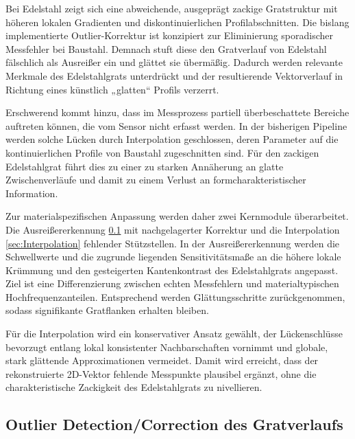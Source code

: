 Bei Edelstahl zeigt sich eine abweichende, ausgeprägt zackige Gratstruktur mit höheren lokalen Gradienten und diskontinuierlichen Profilabschnitten. Die bislang implementierte Outlier-Korrektur ist konzipiert zur Eliminierung sporadischer Messfehler bei Baustahl. Demnach stuft diese den Gratverlauf von Edelstahl fälschlich als Ausreißer ein und glättet sie übermäßig. Dadurch werden relevante Merkmale des Edelstahlgrats unterdrückt und der resultierende Vektorverlauf in Richtung eines künstlich „glatten“ Profils verzerrt.

Erschwerend kommt hinzu, dass im Messprozess partiell überbeschattete Bereiche auftreten können, die vom Sensor nicht erfasst werden. In der bisherigen Pipeline werden solche Lücken durch Interpolation geschlossen, deren Parameter auf die kontinuierlichen Profile von Baustahl zugeschnitten sind. Für den zackigen Edelstahlgrat führt dies zu einer zu starken Annäherung an glatte Zwischenverläufe und damit zu einem Verlust an formcharakteristischer Information.

Zur materialspezifischen Anpassung werden daher zwei Kernmodule überarbeitet. Die Ausreißererkennung \cref{sec:Outlier Detection/Correction} mit nachgelagerter Korrektur und die Interpolation \cref{sec:Interpolation} fehlender Stützstellen. In der Ausreißererkennung werden die Schwellwerte und die zugrunde liegenden Sensitivitätsmaße an die höhere lokale Krümmung und den gesteigerten Kantenkontrast des Edelstahlgrats angepasst. Ziel ist eine Differenzierung zwischen echten Messfehlern und materialtypischen Hochfrequenzanteilen. Entsprechend werden Glättungsschritte zurückgenommen, sodass signifikante Gratflanken erhalten bleiben. 

Für die Interpolation wird ein konservativer Ansatz gewählt, der Lückenschlüsse bevorzugt entlang lokal konsistenter Nachbarschaften vornimmt und globale, stark glättende Approximationen vermeidet. Damit wird erreicht, dass der rekonstruierte 2D-Vektor fehlende Messpunkte plausibel ergänzt, ohne die charakteristische Zackigkeit des Edelstahlgrats zu nivellieren.

\subsection{Outlier Detection/Correction des Gratverlaufs}
\label{sec:Outlier Detection/Correction}

